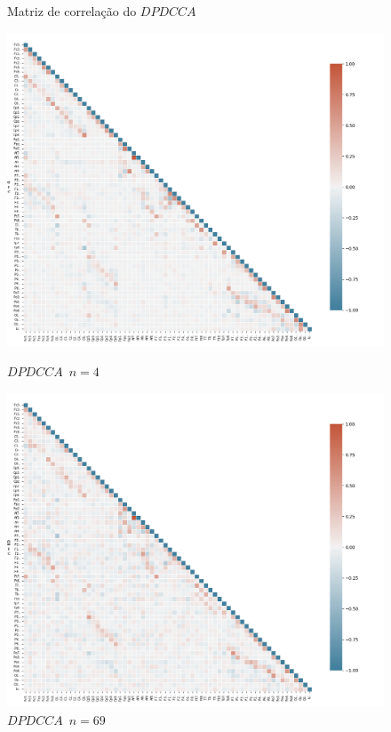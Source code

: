 \begin{figure}[ht]
  \caption{Matriz de correlação do $DPDCCA$}
  \begin{minipage}[b]{0.45\textwidth}
    \includegraphics[width=\textwidth]{../Figures/test_dmc/dpdcca4.png}
    \caption{$DPDCCA$~$n = 4$}
  \end{minipage}
  \hfill
  \begin{minipage}[b]{0.45\textwidth}
    \includegraphics[width=\textwidth]{../Figures/test_dmc/dpdcca69.png}
    \caption{$DPDCCA$~$n = 69$}
  \end{minipage}
\end{figure}



